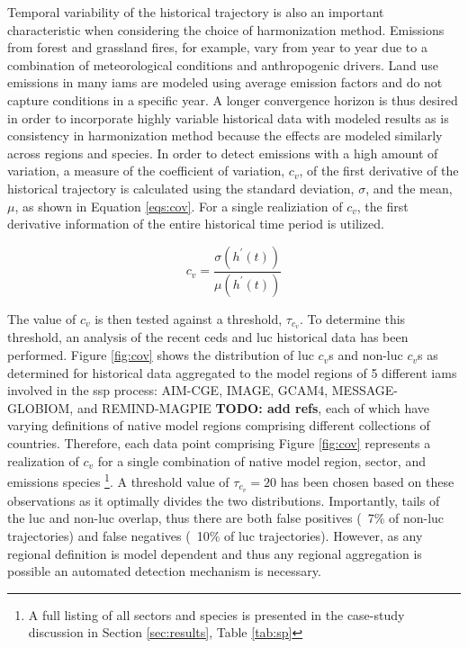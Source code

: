 \documentclass[review]{elsarticle}
\newcommand{\TODO}[1]{\textbf{TODO: #1}}
\begin{document}
Temporal variability of the historical trajectory is also an important
characteristic when considering the choice of harmonization method.  Emissions
from forest and grassland fires, for example, vary from year to year due to a
combination of meteorological conditions and anthropogenic drivers. Land use
emissions in many \glspl{iam} are modeled using average emission factors and do not
capture conditions in a specific year. A longer convergence horizon is thus
desired in order to incorporate highly variable historical data with modeled
results as is consistency in harmonization method because the effects are
modeled similarly across regions and species. In order to detect emissions with
a high amount of variation, a measure of the coefficient of variation, $c_v$, of
the first derivative of the historical trajectory is calculated using the
standard deviation, $\sigma$, and the mean, $\mu$, as shown in Equation
\ref{eqs:cov}. For a single realiziation of $c_v$, the first derivative
information of the entire historical time period is utilized.

\begin{equation}\label{eqs:cov}
    c_v =  \frac{\sigma(h^{\prime}(t))}{\mu(h^{\prime}(t))}
\end{equation}

The value of $c_v$ is then tested against a threshold, $\tau_{c_v}$. To
determine this threshold, an analysis of the recent \gls{ceds} and \gls{luc} historical data
has been performed. Figure \ref{fig:cov} shows the distribution of \gls{luc} $c_v$s
and non-\gls{luc} $c_v$s as determined for historical data aggregated to the model
regions of 5 different \glspl{iam} involved in the \gls{ssp} process: AIM-CGE, IMAGE, GCAM4,
MESSAGE-GLOBIOM, and REMIND-MAGPIE \TODO{add refs}, each of which have varying
definitions of native model regions comprising different collections of
countries. Therefore, each data point comprising Figure \ref{fig:cov} represents
a realization of $c_v$ for a single combination of native model region, sector,
and emissions species \footnote{A full listing of all sectors and species is
  presented in the case-study discussion in Section \ref{sec:results}, Table
  \ref{tab:sp}}. A threshold value of $\tau_{c_v} = 20$ has been chosen based on
these observations as it optimally divides the two distributions. Importantly,
tails of the \gls{luc} and non-\gls{luc} overlap, thus there are both false positives (~7\%
of non-\gls{luc} trajectories) and false negatives (~10\% of \gls{luc}
trajectories). However, as any regional definition is model dependent and thus
any regional aggregation is possible an automated detection mechanism is
necessary.
\end{document}
